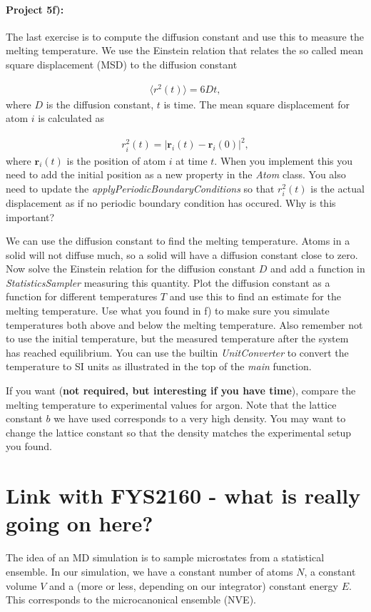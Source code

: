 \documentclass[%
oneside,                 %
final,                   %
10pt]{article}
\begin{document}
\paragraph{Project 5f):}
The last exercise is to compute the diffusion constant and use this to measure the melting temperature. We use the Einstein relation that relates the so called mean square displacement (MSD) to the diffusion constant

\begin{align}
	\langle r^2(t) \rangle = 6Dt,
\end{align}
where $D$ is the diffusion constant, $t$ is time. The mean square displacement for atom $i$ is calculated as

\begin{align}
	r_i^2(t) = |\mathbf{r}_i(t) - \mathbf{r}_i(0)|^2,
\end{align}
where $\mathbf{r}_i(t)$ is the position of atom $i$ at time $t$. When you implement this you need to add the initial position as a new property in the \emph{Atom} class. You also need to update the \emph{applyPeriodicBoundaryConditions} so that $r_i^2(t)$ is the actual displacement as if no periodic boundary condition has occured. Why is this important?

We can use the diffusion constant to find the melting temperature. Atoms in a solid will not diffuse much, so a solid will have a diffusion constant close to zero. Now solve the Einstein relation for the diffusion constant $D$ and add a function in \emph{StatisticsSampler} measuring this quantity. Plot the diffusion constant as a function for different temperatures $T$ and use this to find an estimate for the melting temperature. Use what you found in f) to make sure you simulate temperatures both above and below the melting temperature. Also remember not to use the initial temperature, but the measured temperature after the system has reached equilibrium. You can use the builtin \emph{UnitConverter} to convert the temperature to SI units as illustrated in the top of the \emph{main} function. 

If you want (\textbf{not required, but interesting if you have time}), compare the melting temperature to experimental values for argon. Note that the lattice constant $b$ we have used corresponds to a very high density. You may want to change the lattice constant so that the density matches the experimental setup you found. 

\section{Link with FYS2160 - what is really going on here?}
The idea of an MD simulation is to sample microstates from a statistical ensemble. In our simulation, we have a constant number of atoms $N$, a constant volume $V$ and a (more or less, depending on our integrator) constant energy $E$. This corresponds to the microcanonical ensemble (NVE). 
\end{document}
